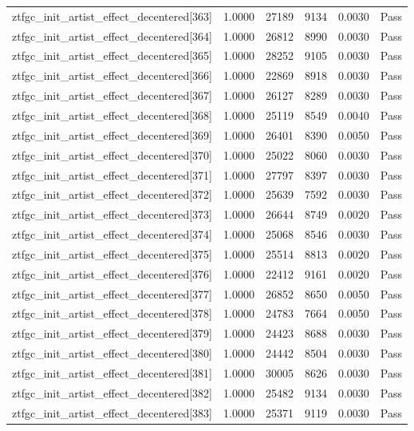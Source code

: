 \begin{table}[htbp]
\begin{tabular}{llrrll}
ztfgc\_init\_artist\_effect\_decentered[363] & 1.0000 & 27189 & 9134 & 0.0030 & Pass \\
ztfgc\_init\_artist\_effect\_decentered[364] & 1.0000 & 26812 & 8990 & 0.0030 & Pass \\
ztfgc\_init\_artist\_effect\_decentered[365] & 1.0000 & 28252 & 9105 & 0.0030 & Pass \\
ztfgc\_init\_artist\_effect\_decentered[366] & 1.0000 & 22869 & 8918 & 0.0030 & Pass \\
ztfgc\_init\_artist\_effect\_decentered[367] & 1.0000 & 26127 & 8289 & 0.0030 & Pass \\
ztfgc\_init\_artist\_effect\_decentered[368] & 1.0000 & 25119 & 8549 & 0.0040 & Pass \\
ztfgc\_init\_artist\_effect\_decentered[369] & 1.0000 & 26401 & 8390 & 0.0050 & Pass \\
ztfgc\_init\_artist\_effect\_decentered[370] & 1.0000 & 25022 & 8060 & 0.0030 & Pass \\
ztfgc\_init\_artist\_effect\_decentered[371] & 1.0000 & 27797 & 8397 & 0.0030 & Pass \\
ztfgc\_init\_artist\_effect\_decentered[372] & 1.0000 & 25639 & 7592 & 0.0030 & Pass \\
ztfgc\_init\_artist\_effect\_decentered[373] & 1.0000 & 26644 & 8749 & 0.0020 & Pass \\
ztfgc\_init\_artist\_effect\_decentered[374] & 1.0000 & 25068 & 8546 & 0.0030 & Pass \\
ztfgc\_init\_artist\_effect\_decentered[375] & 1.0000 & 25514 & 8813 & 0.0020 & Pass \\
ztfgc\_init\_artist\_effect\_decentered[376] & 1.0000 & 22412 & 9161 & 0.0020 & Pass \\
ztfgc\_init\_artist\_effect\_decentered[377] & 1.0000 & 26852 & 8650 & 0.0050 & Pass \\
ztfgc\_init\_artist\_effect\_decentered[378] & 1.0000 & 24783 & 7664 & 0.0050 & Pass \\
ztfgc\_init\_artist\_effect\_decentered[379] & 1.0000 & 24423 & 8688 & 0.0030 & Pass \\
ztfgc\_init\_artist\_effect\_decentered[380] & 1.0000 & 24442 & 8504 & 0.0030 & Pass \\
ztfgc\_init\_artist\_effect\_decentered[381] & 1.0000 & 30005 & 8626 & 0.0030 & Pass \\
ztfgc\_init\_artist\_effect\_decentered[382] & 1.0000 & 25482 & 9134 & 0.0030 & Pass \\
ztfgc\_init\_artist\_effect\_decentered[383] & 1.0000 & 25371 & 9119 & 0.0030 & Pass \\

\end{tabular}
\end{table}
